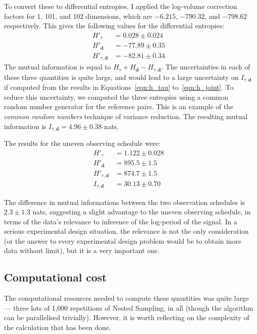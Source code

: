 \documentclass[entropy,article,accept,oneauthor,pdftex,10pt,a4paper]{mdpi}
\renewcommand{\d}{\boldsymbol{d}}
\begin{document}
To convert these to differential entropies, I applied the log-volume
correction factors for 1, 101, and 102 dimensions, which are
$-6.215$, $-790.32$, and $-798.62$ respectively. This gives
the following values for the differential entropies:
\begin{align}
H'_{\tau}     &=  0.028 \pm 0.024 \label{eqn:h_tau}\\
H'_{\d}       &= -77.89 \pm 0.35   \\
H'_{\tau, \d} &= -82.81 \pm 0.34   \label{eqn:h_joint}
\end{align}
The mutual information is equal to $H_{\tau} + H_{\d} - H_{\tau, \d}$. The
uncertainties in each of these three quantities is quite large, and would lead
to a large uncertainty on $I_{\tau, \d}$ if computed from the results
in Equations~\ref{eqn:h_tau} to~\ref{eqn:h_joint}. To reduce this
uncertainty, we computed the three entropies using a common random number
generator for the reference pairs. This is an example of the
{\em common random numbers} technique of variance reduction.
The resulting  mutual information is
$I_{\tau, \d} = 4.96 \pm 0.38$ nats.

The results for the uneven observing schedule were:
\begin{align}
H'_{\tau}     &= 1.122 \pm 0.028 \\
H'_{\d}       &= 895.5 \pm 1.5   \\
H'_{\tau, \d} &= 874.7 \pm 1.5    \\
I_{\tau, \d} &= 30.13 \pm 0.70
\end{align}

The difference in mutual informations between the two observation
schedules is $2.3 \pm 1.3$ nats, suggesting a slight advantage to the
uneven observing schedule, in terms of the data's relevance to inference
of the log-period of the signal.
In a serious experimental design situation, the relevance is not the only
consideration (or the answer to every experimental design problem would
be to obtain more data without limit), but it is a very important one.



\subsection{Computational cost}

The computational resources needed to compute these quantities was quite large
--- three lots of 1,000 repetitions of Nested Sampling, in all
(though the algorithm can be parallelised trivially).
However, it is worth reflecting on the complexity of the calculation that
has been done.
\end{document}
